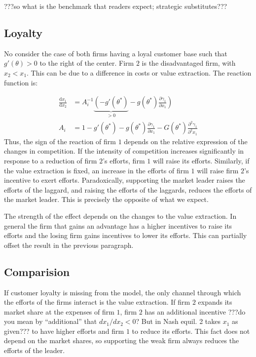 \documentclass[a4paper, 11pt]{article}
\renewcommand{\d}{\text{d}}
\begin{document}
???so what is the benchmark that readers expect; strategic substitutes???

\subsection{Loyalty}
No consider the case of both firms having a loyal customer base such that $g'(\theta)>0$ to the right of the center.  Firm $2$ is the disadvantaged firm, with $x_2<x_1$. This can be due to a difference in costs or value extraction. The reaction function is:

\begin{align}
\frac{\d x_1}{\d x_2} &= A_i^{-1} \underbrace{\left(-g'(\theta^*)\right.}_{>0} - \left.g(\theta^*)\frac{\partial \gamma_1}{\partial x_1}\right)\\
A_i &= 1 - g'(\theta^*)-g(\theta^*)\frac{\partial \gamma_1}{\partial x_1}-G(\theta^*)\frac{\partial^2 \gamma_1}{\partial^2 x_1}
\end{align}
Thus, the sign of the reaction of firm $1$ depends on the relative expression of the changes in competition. If the intensity of competition increases significantly in response to a reduction of firm $2$'s efforts, firm $1$ will raise its efforts. Similarly, if the value extraction is fixed, an increase in the efforts of firm $1$ will raise firm $2$'s incentive to exert efforts. Paradoxically, supporting the market leader raises the efforts of the laggard, and raising the efforts of the laggards, reduces the efforts of the market leader. This is precisely the opposite of what we expect. 

The strength of the effect depends on the changes to the value extraction. In general the firm that gains an advantage has a higher incentives to raise its efforts and the losing firm gains incentives to lower its efforts. This can partially offset the result in the previous paragraph.

\subsection{Comparision}

If customer loyalty is missing from the model, the only channel through which the efforts of the firms interact is the value extraction. If firm $2$ expands its market share at the expenses of firm $1$, firm $2$ has an additional incentive ???do you mean by ``additional'' that $dx_{1}/dx_{2} <0$? But in Nash equil. 2 takes $x_1$ as given??? to have higher efforts and firm $1$ to reduce its efforts. This fact does not depend on the market shares, so supporting the weak firm always reduces the efforts of the leader.
\end{document}
